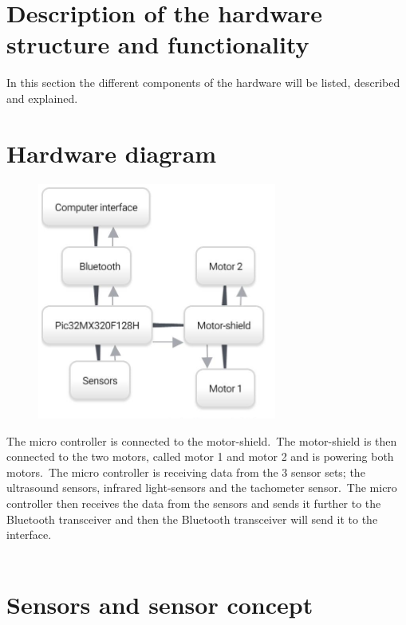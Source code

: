 \section{Description of the hardware structure and functionality}

In this section the different components of the hardware will be listed, described and explained.\


\section{Hardware diagram}
\begin{figure}[!ht]
	\centering
	\includegraphics[width=0.7\textwidth]{figures/hardwareDIA.jpg}
	\caption{}
	\label{Hardware diagram}
\end{figure}

The micro controller is connected to the motor-shield.\ The motor-shield is then connected to the two motors, called motor 1 and motor 2 and is powering both motors.\ The micro controller is receiving data from the 3 sensor sets; the ultrasound sensors, infrared light-sensors and the tachometer sensor.\ The micro controller then receives the data from the sensors and sends it further to the Bluetooth transceiver and then the Bluetooth transceiver will send it to the interface. \\ \\

\section{Sensors and sensor concept}

